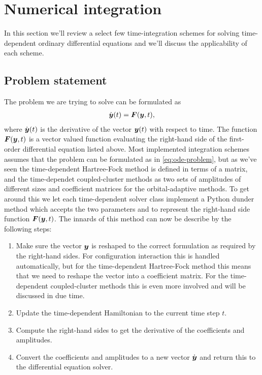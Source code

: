     \section{Numerical integration}
        \label{sec:numerical-integration}
        In this section we'll review a select few time-integration schemes for
        solving time-dependent ordinary differential equations and we'll discuss the
        applicability of each scheme.

        \subsection{Problem statement}
            The problem we are trying to solve can be formulated as
            \begin{align}
                \dot{\boldsymbol{y}}(t) = \boldsymbol{F}(\boldsymbol{y}, t),
                \label{eq:ode-problem}
            \end{align}
            where $\dot{\boldsymbol{y}}(t)$ is the derivative of the vector
            $\boldsymbol{y}(t)$ with respect to time.
            The function $\boldsymbol{F}(\boldsymbol{y}, t)$ is a vector valued function
            evaluating the right-hand side of the first-order differential
            equation listed above.
            Most implemented integration schemes assumes that the problem can
            be formulated as in \autoref{eq:ode-problem}, but as we've seen the
            time-dependent Hartree-Fock method is defined in terms of a matrix,
            and the time-dependet coupled-cluster methods as two sets of
            amplitudes of different sizes and coefficient matrices for the
            orbital-adaptive methods.
            To get around this we let each time-dependent solver class implement
            a Python dunder method  which accepts the two
            parameters  and  to represent the right-hand side
            function $\boldsymbol{F}(\boldsymbol{y}, t)$.
            The innards of this method can now be describe by the following
            steps:
            \begin{enumerate}
                \item Make sure the vector $\boldsymbol{y}$ is reshaped to the correct
                    formulation as required by the right-hand sides.
                    For configuration interaction this is handled automatically,
                    but for the time-dependent Hartree-Fock method this means
                    that we need to reshape the vector into a coefficient
                    matrix.
                    For the time-dependent coupled-cluster methods this is even
                    more involved and will be discussed in due time.
                \item Update the time-dependent Hamiltonian to the current time
                    step $t$.
                \item Compute the right-hand sides to get the derivative of the
                    coefficients and amplitudes.
                \item Convert the coefficients and amplitudes to a new vector
                    $\dot{\boldsymbol{y}}$ and return this to the differential
                    equation solver.
            \end{enumerate}
